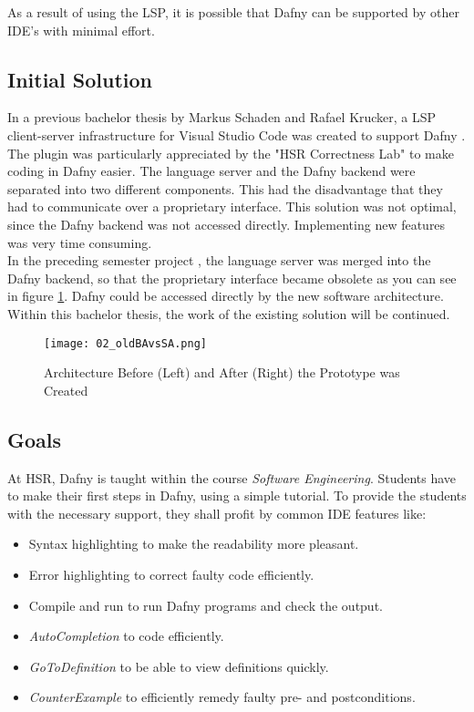 As a result of using the LSP, it is possible that Dafny can be supported by other IDE's with minimal effort.

\subsection{Initial Solution}
\label{section:management_summary:initialsolution}
In a previous bachelor thesis by Markus Schaden and Rafael Krucker, a LSP client-server infrastructure for Visual Studio Code was created to support Dafny \cite{ba}.
The plugin was particularly appreciated by the "HSR Correctness Lab" \cite{correctnessLab} to make coding in Dafny easier.
The language server and the Dafny backend were separated into two different components.
This had the disadvantage that they had to communicate over a proprietary interface.
This solution was not optimal, since the Dafny backend was not accessed directly.
Implementing new features was very time consuming. \\

In the preceding semester project \cite{sa}, the language server was merged into the Dafny backend, so that the proprietary interface became obsolete as you can see in figure \ref{fig:oldBAvsSA}.
Dafny could be accessed directly by the new software architecture.
Within this bachelor thesis, the work of the existing solution will be continued.

\begin{figure}[H]
    \centering
    \texttt{[image: 02\_oldBAvsSA.png]}
    \caption{Architecture Before (Left) and After (Right) the Prototype was Created}
    \label{fig:oldBAvsSA}
\end{figure}

\subsection{Goals}
At HSR, Dafny is taught within the course \textit{Software Engineering}.
Students have to make their first steps in Dafny, using a simple tutorial.
To provide the students with the necessary support, they shall profit by common IDE features like:
\begin{itemize}
    \item Syntax highlighting to make the readability more pleasant.
    \item Error highlighting to correct faulty code efficiently.
    \item Compile and run to run Dafny programs and check the output.
    \item \textit{AutoCompletion} to code efficiently.
    \item \textit{GoToDefinition} to be able to view definitions quickly.
    \item \textit{CounterExample} to efficiently remedy faulty pre- and postconditions.
\end{itemize}

